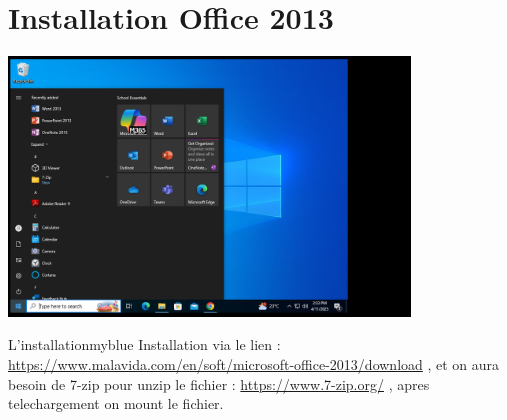 \section{Installation Office 2013}

\begin{center}
    \includegraphics[width=0.8\textwidth]{Question/SC/3-.PNG}
\end{center}

\vspace{0.35cm}

\begin{prettyBox}{L'installation}{myblue}
Installation via le lien : \href{https://www.malavida.com/en/soft/microsoft-office-2013/download}{https://www.malavida.com/en/soft/microsoft-office-2013/download} , et on aura 
besoin de 7-zip pour unzip le fichier : \href{https://www.7-zip.org/}{https://www.7-zip.org/} , apres telechargement on mount le fichier.
\end{prettyBox}


